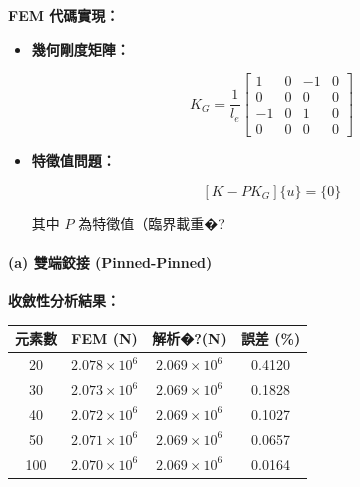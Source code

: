 \documentclass[UTF8, a4paper, 12pt]{ctexart}
\begin{document}
\textbf{FEM 代碼實現：}

\begin{itemize}

    \item \textbf{幾何剛度矩陣：}

    \begin{equation}

        K_G = \frac{1}{l_e} \begin{bmatrix} 1 & 0 & -1 & 0 \\ 0 & 0 & 0 & 0 \\ -1 & 0 & 1 & 0 \\ 0 & 0 & 0 & 0 \end{bmatrix}

    \end{equation}

    \item \textbf{特徵值問題：}

    \begin{equation}

        [K - P K_G] \{u\} = \{0\}

    \end{equation}

    其中 $P$ 為特徵值（臨界載重�?

\end{itemize}



\paragraph{(a) 雙端鉸接 (Pinned-Pinned)}



\textbf{收斂性分析結果：}



\begin{center}

\begin{tabular}{cccc}

\toprule

\textbf{元素數} & \textbf{FEM (N)} & \textbf{解析�?(N)} & \textbf{誤差 (\%)} \\

\midrule

20 & $2.078\times10^6$ & $2.069\times10^6$ & 0.4120 \\

30 & $2.073\times10^6$ & $2.069\times10^6$ & 0.1828 \\

40 & $2.072\times10^6$ & $2.069\times10^6$ & 0.1027 \\

50 & $2.071\times10^6$ & $2.069\times10^6$ & 0.0657 \\

100 & $2.070\times10^6$ & $2.069\times10^6$ & 0.0164 \\

\bottomrule

\end{tabular}

\end{center}
\end{document}
